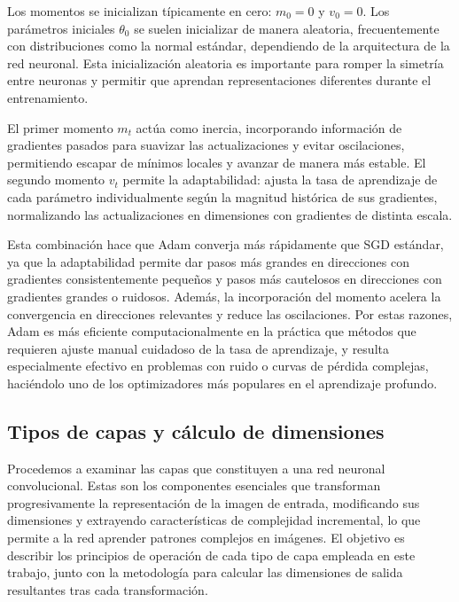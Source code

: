 \begin{itemize}
    Los momentos se inicializan típicamente en cero: $m_0 = 0$ y $v_0 = 0$. Los parámetros iniciales $\theta_0$ se suelen inicializar de manera aleatoria, frecuentemente con distribuciones como la normal estándar, dependiendo de la arquitectura de la red neuronal. Esta inicialización aleatoria es importante para romper la simetría entre neuronas y permitir que aprendan representaciones diferentes durante el entrenamiento.
    
    El primer momento $m_t$ actúa como inercia, incorporando información de gradientes pasados para suavizar las actualizaciones y evitar oscilaciones, permitiendo escapar de mínimos locales y avanzar de manera más estable. El segundo momento $v_t$ permite la adaptabilidad: ajusta la tasa de aprendizaje de cada parámetro individualmente según la magnitud histórica de sus gradientes, normalizando las actualizaciones en dimensiones con gradientes de distinta escala.
    
    Esta combinación hace que Adam converja más rápidamente que SGD estándar, ya que la adaptabilidad permite dar pasos más grandes en direcciones con gradientes consistentemente pequeños y pasos más cautelosos en direcciones con gradientes grandes o ruidosos. Además, la incorporación del momento acelera la convergencia en direcciones relevantes y reduce las oscilaciones. Por estas razones, Adam es más eficiente computacionalmente en la práctica que métodos que requieren ajuste manual cuidadoso de la tasa de aprendizaje, y resulta especialmente efectivo en problemas con ruido o curvas de pérdida complejas, haciéndolo uno de los optimizadores más populares en el aprendizaje profundo.
\end{itemize}

\subsection{Tipos de capas y cálculo de dimensiones}\label{sec:tipos_capas}

Procedemos a examinar las capas que constituyen a una red neuronal convolucional. Estas son los componentes esenciales que transforman progresivamente la representación de la imagen de entrada, modificando sus dimensiones y extrayendo características de complejidad incremental, lo que permite a la red aprender patrones complejos en imágenes. El objetivo es describir los principios de operación de cada tipo de capa empleada en este trabajo, junto con la metodología para calcular las dimensiones de salida resultantes tras cada transformación.

